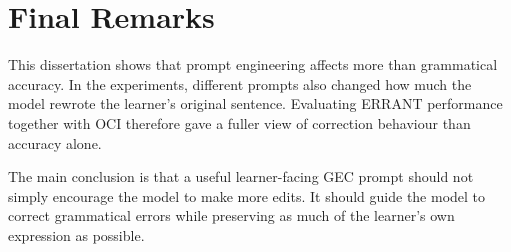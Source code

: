 \section{Final Remarks}

This dissertation shows that prompt engineering affects more than grammatical accuracy. In the experiments, different prompts also changed how much the model rewrote the learner's original sentence. Evaluating ERRANT performance together with OCI therefore gave a fuller view of correction behaviour than accuracy alone.

The main conclusion is that a useful learner-facing GEC prompt should not simply encourage the model to make more edits. It should guide the model to correct grammatical errors while preserving as much of the learner's own expression as possible.

